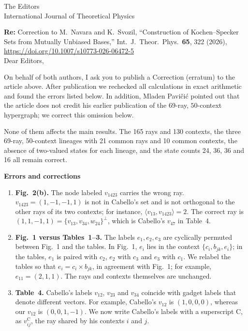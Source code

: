 \documentclass[11pt]{letter}
\date{November 18, 2026}
\begin{document}
\begin{letter}{The Editors\\
International Journal of Theoretical Physics}

\opening{\textbf{Re:} Correction to M.~Navara and K.~Svozil, ``Construction of Kochen--Specker Sets from Mutually Unbiased Bases,'' Int.\ J.\ Theor.\ Phys.\ \textbf{65}, 322 (2026), \url{https://doi.org/10.1007/s10773-026-06472-5}\\[2ex]
Dear Editors,}

On behalf of both authors, I ask you to publish a Correction (erratum) to the article above.
After publication we rechecked all calculations in exact arithmetic and found the errors listed below.
In addition, Mladen Pavi\v{c}i\'{c} pointed out that the article does not credit his earlier publication of the $69$-ray, $50$-context hypergraph; we correct this omission below.

None of them affects the main results.
The 165 rays and 130 contexts, the three 69-ray, 50-context lineages with 21 common rays and 10 common contexts, the absence of two-valued states for each lineage, and the state counts 24, 36, 36 and 16 all remain correct.

\medskip\noindent\textbf{Errors and corrections}

\begin{enumerate}[leftmargin=*]
\item \textbf{Fig.~2(b).}
The node labeled $v_{1423}$ carries the wrong ray.
$v_{1423}=(1,-1,-1,1)$ is not in Cabello's set and is not orthogonal to the other rays of its two contexts; for instance, $\langle v_{13},v_{1423}\rangle=2$.
The correct ray is $(1,1,-1,1)=\{v_{13},v_{34},w_{24}\}^\perp$, which is Cabello's $v_{47}$ in Table~4.

\item \textbf{Fig.~1 versus Tables~1--3.}
The labels $e_1,e_2,e_3$ are cyclically permuted between Fig.~1 and the tables.
In Fig.~1, $e_i$ lies in the context $\{c_i,b_{jk},e_i\}$; in the tables, $e_1$ is paired with $c_2$, $e_2$ with $c_3$ and $e_3$ with $c_1$.
We relabel the tables so that $e_i=c_i\times b_{jk}$, in agreement with Fig.~1; for example, $e_{11}=(2,1,1)$.
The rays and contexts themselves are unchanged.

\item \textbf{Table~4.}
Cabello's labels $v_{12}$, $v_{23}$ and $v_{34}$ coincide with gadget labels that denote different vectors.
For example, Cabello's $v_{12}$ is $(1,0,0,0)$, whereas our $v_{12}$ is $(0,0,1,-1)$.
We now write Cabello's labels with a superscript C, as $v^{\mathrm{C}}_{ij}$, the ray shared by his contexts $i$ and $j$.


\end{enumerate}
\end{letter}
\end{document}
